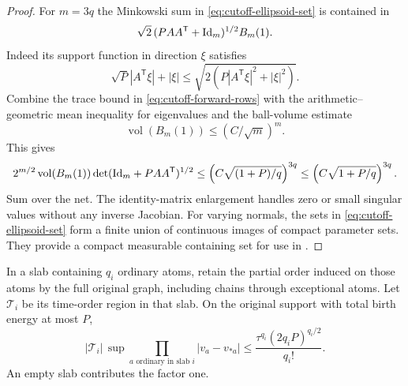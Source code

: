 \begin{proof}
For \(m=3q\) the Minkowski sum in
\eqref{eq:cutoff-ellipsoid-set} is contained in
\[
 \sqrt2\,(PAA^{\mathsf T}+\mathrm{Id}_m)^{1/2}B_m(1).
\]
Indeed its support function in direction \(\xi\) satisfies
\[
 \sqrt P|A^{\mathsf T}\xi|+|\xi|
 \leq \sqrt{2(P|A^{\mathsf T}\xi|^2+|\xi|^2)}.
\]
Combine the trace bound in \eqref{eq:cutoff-forward-rows}
with the arithmetic--geometric mean inequality for eigenvalues
and the ball-volume estimate
\[
 \operatorname{vol}(B_m(1))\leq(C/\sqrt m)^m.
\]
This gives
\[
 2^{m/2}\operatorname{vol}(B_m(1))
 \det(\mathrm{Id}_m+PAA^{\mathsf T})^{1/2}
 \leq \left(C\sqrt{(1+P)/q}\right)^{3q}
 \leq \left(C\sqrt{1+P/q}\right)^{3q}.
 \]
Sum over the net.  The identity-matrix enlargement handles
zero or small singular values without any inverse Jacobian.
For varying normals, the sets in
\eqref{eq:cutoff-ellipsoid-set} form a finite union of
continuous images of compact parameter sets.  They provide
a compact measurable containing set for use in
.
\end{proof}

\begin{lemma}\label{lem:cutoff-time}
In a slab containing \(q_i\) ordinary atoms, retain the partial
order induced on those atoms by the full original graph,
including chains through exceptional atoms.  Let
\(\mathcal T_i\) be its time-order region in that slab.
On the original support with total birth energy at most \(P\),
\begin{equation}\label{eq:cutoff-time}
 |\mathcal T_i|\,
 \sup \prod_{a\text{ ordinary in slab }i}|v_a-v_{*a}|
 \leq
 \frac{\tau^{q_i}(2q_iP)^{q_i/2}}{q_i!}.
\end{equation}
An empty slab contributes the factor one.
\end{lemma}

